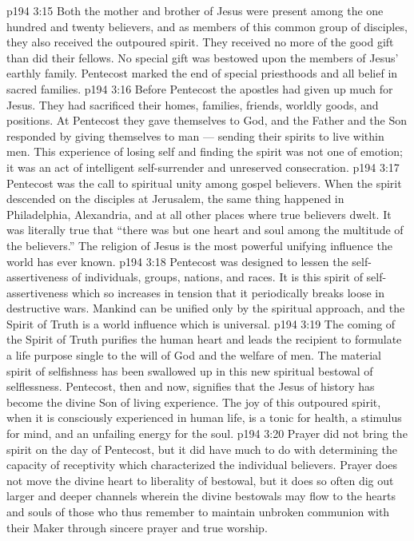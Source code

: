 \vs p194 3:15 \pc Both the mother and brother of Jesus were present among the one hundred and twenty believers, and as members of this common group of disciples, they also received the outpoured spirit. They received no more of the good gift than did their fellows. No special gift was bestowed upon the members of Jesus’ earthly family. Pentecost marked the end of special priesthoods and all belief in sacred families.
\vs p194 3:16 \pc Before Pentecost the apostles had given up much for Jesus. They had sacrificed their homes, families, friends, worldly goods, and positions. At Pentecost they gave themselves to God, and the Father and the Son responded by giving themselves to man --- sending their spirits to live within men. This experience of losing self and finding the spirit was not one of emotion; it was an act of intelligent self\hyp{}surrender and unreserved consecration.
\vs p194 3:17 Pentecost was the call to spiritual unity among gospel believers. When the spirit descended on the disciples at Jerusalem, the same thing happened in Philadelphia, Alexandria, and at all other places where true believers dwelt. It was literally true that “there was but one heart and soul among the multitude of the believers.” The religion of Jesus is the most powerful unifying influence the world has ever known.
\vs p194 3:18 \pc Pentecost was designed to lessen the self\hyp{}assertiveness of individuals, groups, nations, and races. It is this spirit of self\hyp{}assertiveness which so increases in tension that it periodically breaks loose in destructive wars. Mankind can be unified only by the spiritual approach, and the Spirit of Truth is a world influence which is universal.
\vs p194 3:19 The coming of the Spirit of Truth purifies the human heart and leads the recipient to formulate a life purpose single to the will of God and the welfare of men. The material spirit of selfishness has been swallowed up in this new spiritual bestowal of selflessness. Pentecost, then and now, signifies that the Jesus of history has become the divine Son of living experience. The joy of this outpoured spirit, when it is consciously experienced in human life, is a tonic for health, a stimulus for mind, and an unfailing energy for the soul.
\vs p194 3:20 \pc Prayer did not bring the spirit on the day of Pentecost, but it did have much to do with determining the capacity of receptivity which characterized the individual believers. Prayer does not move the divine heart to liberality of bestowal, but it does so often dig out larger and deeper channels wherein the divine bestowals may flow to the hearts and souls of those who thus remember to maintain unbroken communion with their Maker through sincere prayer and true worship.
